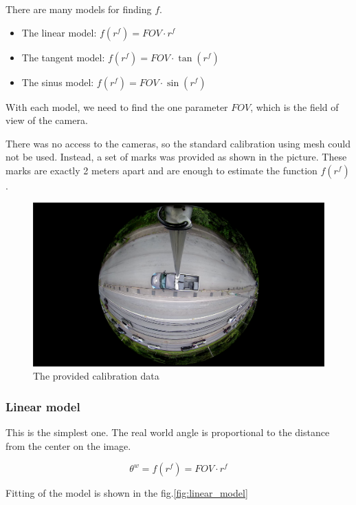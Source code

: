 \documentclass[a4paper,12pt,titlepage, twoside]{article}
\numberwithin{figure}{section}
\begin{document}
There are many models for finding $f$. 

\begin{itemize}
\item The linear model: $f(r^f) = FOV \cdot r^f$
\item The tangent model: $f(r^f) = FOV \cdot \tan(r^f)$
\item The sinus model: $f(r^f) = FOV \cdot \sin(r^f)$
\end{itemize}

With each model, we need to find the one parameter $FOV$, which is the field of view of the camera.

There was no access to the cameras, so the standard calibration using mesh could not be used. Instead, a set of marks was provided as shown in the picture. These marks are exactly 2 meters apart and are enough to estimate the function $f(r^f)$.

\begin{figure}[h!]
\centering
\includegraphics[width=1\linewidth]{fig/calibration.png}
\caption{The provided calibration data}
\label{fig:calibration}
\end{figure}


\subsubsection{Linear model}

This is the simplest one. The real world angle is proportional to the distance from the center on the image. 

\begin{equation}
\theta^w = f(r^f) = FOV \cdot r^f
\end{equation}

Fitting of the model is shown in the fig.\ref{fig:linear_model}
\end{document}
